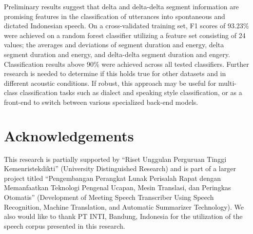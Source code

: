 \documentclass[conference]{IEEEtran}
\begin{document}
Preliminary results suggest that delta and delta-delta segment information are promising features in the classification of utterances into spontaneous and dictated Indonesian speech.
On a cross-validated training set, F1 scores of 93.23\% were achieved on a random forest classifier utilizing a feature set consisting of 24 values; the averages and deviations of segment duration and energy, delta segment duration and energy, and delta-delta segment duration and engery.
Classification results above 90\% were achieved across all tested classifiers.
Further research is needed to determine if this holds true for other datasets and in different acoustic conditions.
If robust, this approach may be useful for multi-class classification tasks such as dialect and speaking style classification, or as a front-end to switch between various specialized back-end models.

\section*{Acknowledgements}

This research is partially supported by “Riset Unggulan
Perguruan Tinggi Kemenristekdikti” (University
Distinguished Research) and is part of a larger project titled
“Pengembangan Perangkat Lunak Perisalah Rapat dengan
Memanfaatkan Teknologi Pengenal Ucapan, Mesin Translasi,
dan Peringkas Otomatis” (Development of Meeting Speech
Transcriber Using Speech Recognition, Machine Translation,
and Automatic Summarizer Technology). We also would like
to thank PT INTI, Bandung, Indonesia for the utilization of
the speech corpus presented in this research.
\end{document}
